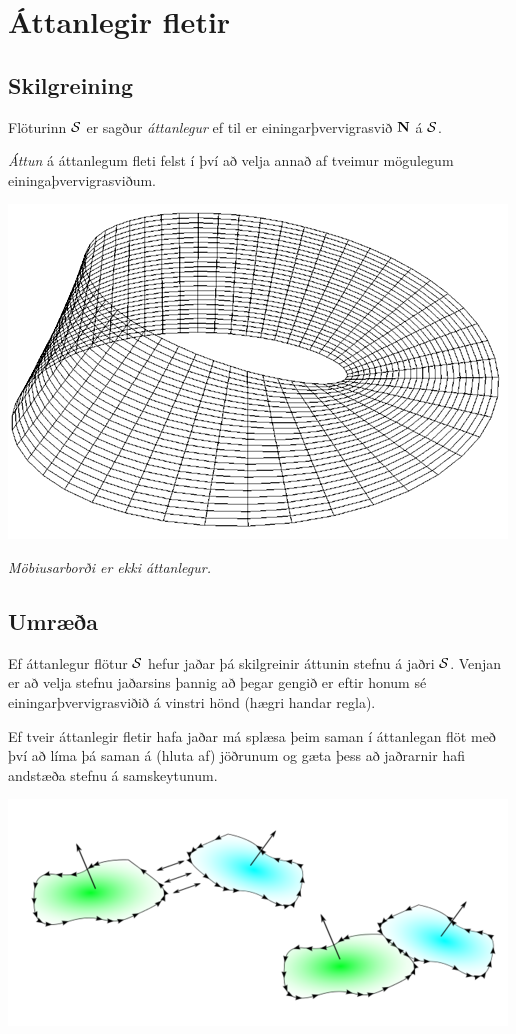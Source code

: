 \documentclass[a4paper,10pt,icelandic]{sphinxmanual}
\begin{document}

\section{Áttanlegir fletir}
\label{Kafli5:index-9}\label{Kafli5:attanlegir-fletir}

\subsection{Skilgreining}
\label{Kafli5:id24}
Flöturinn \(\cal S\) er sagður \textit{áttanlegur} ef til er
einingarþvervigrasvið \(\mbox{${\bf N}$}\) á \(\cal S\).

\textit{Áttun} á áttanlegum fleti felst í því að velja annað af tveimur mögulegum
einingaþvervigrasviðum.

{\hfill\includegraphics[width=0.400\linewidth]{mobius.png}\hfill}

\emph{Möbiusarborði er ekki áttanlegur.}


\subsection{Umræða}
\label{Kafli5:umraea}
Ef áttanlegur flötur \(\cal S\) hefur jaðar þá skilgreinir áttunin
stefnu á jaðri \(\cal S\). Venjan er að velja stefnu jaðarsins
þannig að þegar gengið er eftir honum sé einingarþvervigrasviðið á
vinstri hönd (hægri handar regla).

Ef tveir áttanlegir fletir hafa jaðar má splæsa þeim saman í áttanlegan
flöt með því að líma þá saman á (hluta af) jöðrunum og gæta þess að
jaðrarnir hafi andstæða stefnu á samskeytunum.

{\hfill\includegraphics[width=0.700\linewidth]{joinsurf.png}\hfill}
\end{document}
